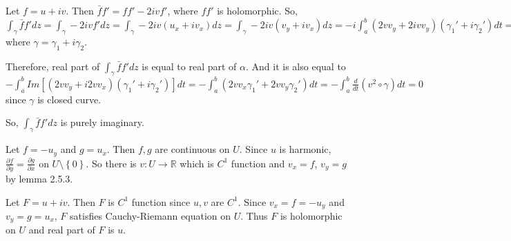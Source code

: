\begin{problem}[2.1] \hfill

	Let $f = u+ iv$. Then $\bar{f}f' = ff' - 2ivf'$, where $ff'$ is holomorphic. So, $\int_\gamma \bar{f}f' dz = \int_\gamma -2ivf' dz = \int_\gamma -2iv(u_x + iv_x)dz = \int_\gamma -2iv(v_y + iv_x)dz = -i \int_a^b (2vv_y + 2ivv_y)(\gamma_1 ' + i\gamma_2 ') dt = \alpha$ where $\gamma = \gamma_1 + i\gamma_2$.
	
	Therefore, real part of $\int_\gamma \bar{f} f' dz$ is equal to real part of $\alpha$. And it is also equal to $-\int_a^b Im \left [ (2vv_y + i2vv_x)(\gamma_1 ' + i\gamma_2 ')\right ]dt = -\int_a^b (2vv_x \gamma_1 ' + 2vv_y \gamma_2') dt = -\int_a^b \frac{d}{dt}(v^2 \circ \gamma) dt = 0$ since $\gamma$ is closed curve.

	So, $\int_\gamma \bar{f}f' dz$ is purely imaginary.
\end{problem}

\begin{problem}[2.2] \hfill

	Let $f = -u_y$ and $g = u_x$. Then $f, g$ are continuous on $U$. Since $u$ is harmonic, $\frac{\partial f}{\partial y} = \frac{\partial g}{ \partial x}$ on $U \setminus \left\{ 0 \right\} $. So there is $v: U \rightarrow \mathbb{R}$ which is $C^1$ function and $v_x = f$, $v_y = g$ by lemma 2.5.3.

	Let $F = u+ iv$. Then $F$ is $C^1$ function since $u, v$ are $C^1$. Since $v_x = f = -u_y$ and $v_y = g = u_x$, $F$ satisfies Cauchy-Riemann equation on $U$. Thus $F$ is holomorphic on $U$ and real part of $F$ is $u$.
	
\end{problem}

